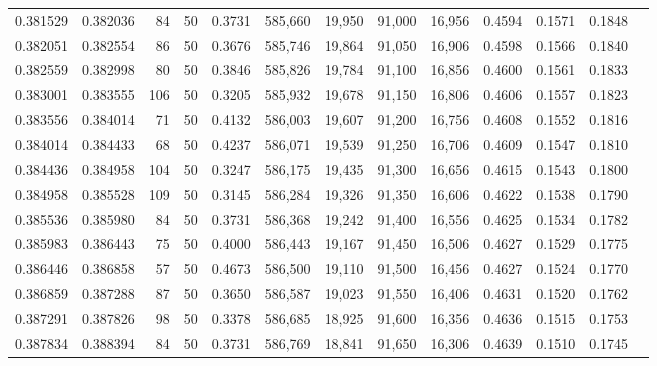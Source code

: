 \begin{tabular}{rrrrrrrrrrrrr}
0.381529 & 0.382036 &    84 &  50 &                                     0.3731 & 585,660 &  19,950 &  91,000 &  16,956 & 0.4594 & 0.1571 & 0.1848 \\
0.382051 & 0.382554 &    86 &  50 &                                     0.3676 & 585,746 &  19,864 &  91,050 &  16,906 & 0.4598 & 0.1566 & 0.1840 \\
0.382559 & 0.382998 &    80 &  50 &                                     0.3846 & 585,826 &  19,784 &  91,100 &  16,856 & 0.4600 & 0.1561 & 0.1833 \\
0.383001 & 0.383555 &   106 &  50 &                                     0.3205 & 585,932 &  19,678 &  91,150 &  16,806 & 0.4606 & 0.1557 & 0.1823 \\
0.383556 & 0.384014 &    71 &  50 &                                     0.4132 & 586,003 &  19,607 &  91,200 &  16,756 & 0.4608 & 0.1552 & 0.1816 \\
0.384014 & 0.384433 &    68 &  50 &                                     0.4237 & 586,071 &  19,539 &  91,250 &  16,706 & 0.4609 & 0.1547 & 0.1810 \\
0.384436 & 0.384958 &   104 &  50 &                                     0.3247 & 586,175 &  19,435 &  91,300 &  16,656 & 0.4615 & 0.1543 & 0.1800 \\
0.384958 & 0.385528 &   109 &  50 &                                     0.3145 & 586,284 &  19,326 &  91,350 &  16,606 & 0.4622 & 0.1538 & 0.1790 \\
0.385536 & 0.385980 &    84 &  50 &                                     0.3731 & 586,368 &  19,242 &  91,400 &  16,556 & 0.4625 & 0.1534 & 0.1782 \\
0.385983 & 0.386443 &    75 &  50 &                                     0.4000 & 586,443 &  19,167 &  91,450 &  16,506 & 0.4627 & 0.1529 & 0.1775 \\
0.386446 & 0.386858 &    57 &  50 &                                     0.4673 & 586,500 &  19,110 &  91,500 &  16,456 & 0.4627 & 0.1524 & 0.1770 \\
0.386859 & 0.387288 &    87 &  50 &                                     0.3650 & 586,587 &  19,023 &  91,550 &  16,406 & 0.4631 & 0.1520 & 0.1762 \\
0.387291 & 0.387826 &    98 &  50 &                                     0.3378 & 586,685 &  18,925 &  91,600 &  16,356 & 0.4636 & 0.1515 & 0.1753 \\
0.387834 & 0.388394 &    84 &  50 &                                     0.3731 & 586,769 &  18,841 &  91,650 &  16,306 & 0.4639 & 0.1510 & 0.1745 \\

\end{tabular}
